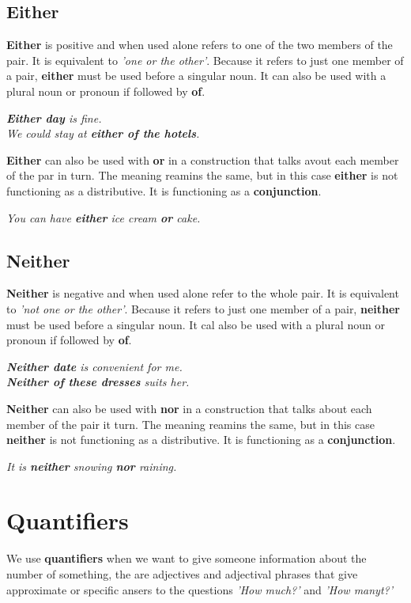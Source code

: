 \documentclass[10pt,a4paper]{article}
\begin{document}
\newpage
\subsection{Either}
\textbf{Either} is positive and when used alone refers to one of the two members of the pair. It is equivalent to \textit{'one or the other'}. Because it refers to just one member of a pair, \textbf{either} must be used before a singular noun. It can also be used with a plural noun or pronoun if followed by \textbf{of}.
\begin{center}
		\textit{ \textbf{Either day} is fine.\\
		We could stay at \textbf{either of the hotels}.}
\end{center}
\textbf{Either} can also be used with \textbf{or} in a construction that talks avout each member of the par in turn. The meaning reamins the same, but in this case \textbf{either} is not functioning as a distributive. It is functioning as a \textbf{conjunction}.
\begin{center}
\textit{ You can have \textbf{either} ice cream \textbf{or} cake.}
\end{center}

\subsection{Neither}
\textbf{Neither} is negative and when used alone refer to the whole pair. It is equivalent to \textit{'not one or the other'}. Because it refers to just one member of a pair, \textbf{neither} must be used before a singular noun. It cal also be used with a plural noun or pronoun if followed by \textbf{of}.
\begin{center}
\textit{ \textbf{Neither date} is convenient for me.\\
\textbf{Neither of these dresses} suits her.}
\end{center}
\textbf{Neither} can also be used with \textbf{nor} in a construction that talks about each member of the pair it turn. The meaning reamins the same, but in this case \textbf{neither} is not functioning as a distributive. It is functioning as a \textbf{conjunction}.
\begin{center}
\textit{ It is \textbf{neither} snowing \textbf{nor} raining.}
\end{center}

\section{Quantifiers}
We use \textbf{quantifiers} when we want to give someone information about the number of something, the are adjectives and adjectival phrases that give approximate or specific ansers to the questions \textit{'How much?'} and \textit{'How manyt?'}
\end{document}

